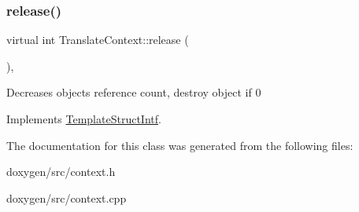 \mbox{\label{class_translate_context_a1fa557ada4404a339cae9d011074a56b}} 
\subsubsection{\texorpdfstring{release()}{release()}}
{\footnotesize\ttfamily virtual int Translate\+Context\+::release (\begin{DoxyParamCaption}{ }\end{DoxyParamCaption})\hspace{0.3cm}{\ttfamily [inline]}, {\ttfamily [virtual]}}

Decreases object\textquotesingle{}s reference count, destroy object if 0 

Implements \mbox{\hyperlink{class_template_struct_intf_a3dce7dd29d3f66a8080b40578e8a5045}{Template\+Struct\+Intf}}.



The documentation for this class was generated from the following files\+:\begin{DoxyCompactItemize}
\item 
doxygen/src/context.\+h\item 
doxygen/src/context.\+cpp\end{DoxyCompactItemize}
